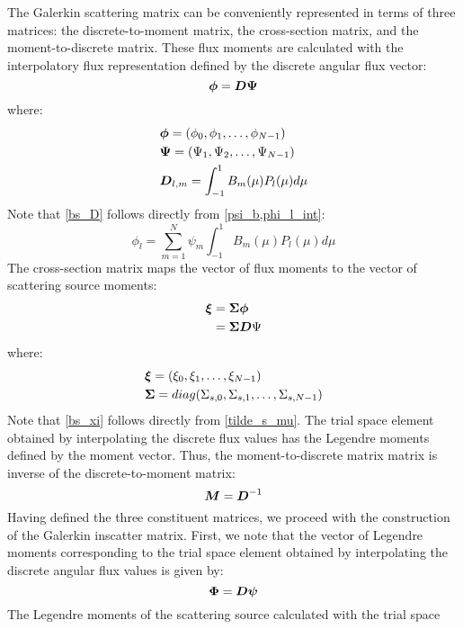 The Galerkin scattering matrix can be conveniently represented in terms of
three matrices: the discrete-to-moment matrix, the cross-section matrix, and
the moment-to-discrete matrix. These flux moments are calculated with the 
interpolatory flux representation defined by the discrete angular flux vector:
\begin{equation}
\boldsymbol{\phi} = \boldsymbol{D\Psi}
\end{equation}
where:
\begin{align}
&\bs{\phi} = (\phi_0,\phi_1,\hdots,\phi_{N-1})\\
&\bs{\Psi} = (\Psi_1,\Psi_2,\hdots,\Psi_{N-1})\\
&\bs{D}_{l,m} = \int_{-1}^1 B_m(\mu) P_l(\mu)d\mu \label{bs_D}
\end{align}
Note that \cref{bs_D} follows directly from \cref{psi_b,phi_l_int}:
\begin{equation}
\phi_l = \sum_{m=1}^{N} \psi_m \int_{-1}^1 B_m(\mu) P_l(\mu)d\mu
\end{equation}
The cross-section matrix maps the vector of flux moments to the vector of
scattering source moments:
\begin{equation}
\begin{split}
\bs{\xi} &= \bs{\Sigma \phi}\\
&= \bs{\Sigma D}\Psi
\label{bs_xi}
\end{split}
\end{equation}
where:
\begin{align}
&\bs{\xi} = (\xi_0,\xi_1,\hdots,\xi_{N-1})\\
&\bs{\Sigma} = diag(\Sigma_{s,0},\Sigma_{s,1},\hdots,\Sigma_{s,N-1})
\label{bs_sigma}
\end{align}
Note that \cref{bs_xi} follows directly from \cref{tilde_s_mu}. The trial space 
element obtained by interpolating the discrete flux values has the Legendre moments 
defined by the moment vector. Thus, the moment-to-discrete matrix matrix is inverse 
of the discrete-to-moment matrix:
\begin{equation}
\boldsymbol{M} = \boldsymbol{D}^{-1}
\end{equation}
Having defined the three constituent matrices, we proceed with the
construction of the Galerkin inscatter matrix. First, we note that the
vector of Legendre moments corresponding to the trial space element obtained
by interpolating the discrete angular flux values is given by:
\begin{equation}
\boldsymbol{\Phi} = \boldsymbol{D\psi}
\end{equation}
The Legendre moments of the scattering source calculated with the trial space
